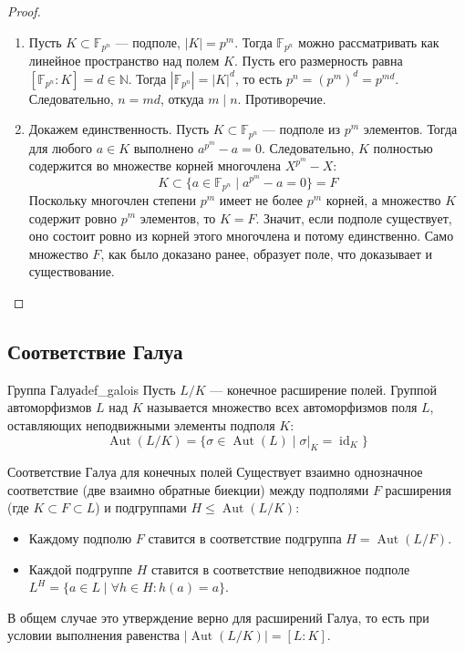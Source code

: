 \begin{proof}
	\begin{enumerate}
		\item Пусть $K \subset \mathbb{F}_{p^n}$ --- подполе, $|K| = p^m$. Тогда $\mathbb{F}_{p^n}$ можно рассматривать как линейное пространство над полем $K$. Пусть его размерность равна $[\mathbb{F}_{p^n} : K] = d \in \mathbb{N}$. Тогда $|\mathbb{F}_{p^n}| = |K|^d$, то есть $p^n = (p^m)^d = p^{md}$. Следовательно, $n = md$, откуда $m \mid n$. Противоречие.
		
		\item Докажем единственность. Пусть $K \subset \mathbb{F}_{p^n}$ --- подполе из $p^m$ элементов. Тогда для любого $a \in K$ выполнено $a^{p^m} - a = 0$. Следовательно, $K$ полностью содержится во множестве корней многочлена $X^{p^m}-X$:
		\[ K \subset \{ a \in \mathbb{F}_{p^n} \mid a^{p^m} - a = 0 \} = F \]
		Поскольку многочлен степени $p^m$ имеет не более $p^m$ корней, а множество $K$ содержит ровно $p^m$ элементов, то $K = F$. Значит, если подполе существует, оно состоит ровно из корней этого многочлена и потому единственно. Само множество $F$, как было доказано ранее, образует поле, что доказывает и существование.
	\end{enumerate}
\end{proof}

\subsection{Соответствие Галуа}

\begin{Definition}{Группа Галуа}{def_galois}
	Пусть $L/K$ --- конечное расширение полей. Группой автоморфизмов $L$ над $K$ называется множество всех автоморфизмов поля $L$, оставляющих неподвижными элементы подполя $K$:
	\[ \operatorname{Aut}(L/K) = \{ \sigma \in \operatorname{Aut}(L) \mid \sigma|_K = \operatorname{id}_K \} \]
\end{Definition}

\begin{Statement}{Соответствие Галуа для конечных полей}{}
	Существует взаимно однозначное соответствие (две взаимно обратные биекции) между подполями $F$ расширения (где $K \subset F \subset L$) и подгруппами $H \le \operatorname{Aut}(L/K)$:
	\begin{itemize}
		\item Каждому подполю $F$ ставится в соответствие подгруппа $H = \operatorname{Aut}(L/F)$.
		\item Каждой подгруппе $H$ ставится в соответствие неподвижное подполе $L^H = \{ a \in L \mid \forall h \in H : h(a) = a \}$.
	\end{itemize}
\end{Statement}

\begin{Remark}{}{}
	В общем случае это утверждение верно для расширений Галуа, то есть при условии выполнения равенства $|\operatorname{Aut}(L/K)| = [L : K]$.
\end{Remark}
